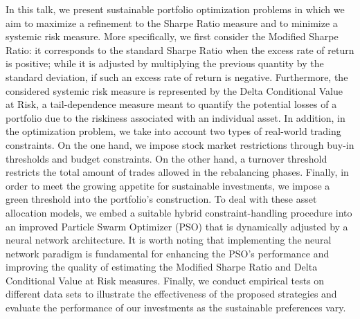 
\begin{Abstrakt}
    In this talk, we present sustainable portfolio optimization problems in which we aim to maximize a refinement to the Sharpe Ratio measure and to minimize a systemic risk measure. More specifically, we first consider the Modified Sharpe Ratio: it corresponds to the standard Sharpe Ratio when the excess rate of return is positive; while it is adjusted by multiplying the previous quantity by the standard deviation, if such an excess rate of return is negative. Furthermore, the considered systemic risk measure is represented by the Delta Conditional Value at Risk, a tail-dependence measure meant to quantify the potential losses of a portfolio due to the riskiness associated with an individual asset. In addition, in the optimization problem, we take into account two types of real-world trading constraints. On the one hand, we impose stock market restrictions through buy-in thresholds and budget constraints. On the other hand, a turnover threshold restricts the total amount of trades allowed in the rebalancing phases. Finally, in order to meet the growing appetite for sustainable investments, we impose a green threshold into the portfolio’s construction. To deal with these asset allocation models, we embed a suitable hybrid constraint-handling procedure into an improved Particle Swarm Optimizer (PSO) that is dynamically adjusted by a neural network architecture. It is worth noting that implementing the neural network paradigm is fundamental for enhancing the PSO’s performance and improving the quality of estimating the Modified Sharpe Ratio and Delta Conditional Value at Risk measures. Finally, we conduct empirical tests on different data sets to illustrate the effectiveness of the proposed strategies and evaluate the performance of our investments as the sustainable preferences vary.
\end{Abstrakt}



\clearpage